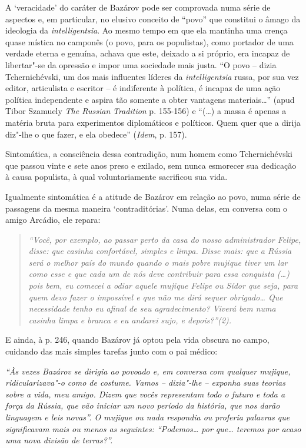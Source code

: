 A `veracidade' do caráter de Bazárov pode ser comprovada numa série de
aspectos e, em particular, no elusivo conceito de ``povo'' que constitui
o âmago da ideologia da \emph{intelligentsia}. Ao mesmo tempo em que ela
mantinha uma crença quase mística no camponês (o povo, para os
populistas), como portador de uma verdade eterna e genuína, achava que
este, deixado a si próprio, era incapaz de libertar"-se da opressão e
impor uma sociedade mais justa. ``O povo -- dizia Tchernichévski, um dos
mais influentes líderes da \emph{intelligentsia} russa, por sua vez
editor, articulista e escritor -- é indiferente à política, é incapaz de
uma ação política independente e aspira tão somente a obter vantagens
materiais\ldots{}'' (apud Tibor Szamuely \emph{The Russian} { }
\emph{Tradition} p. 155-156) e ``(\ldots{}) a massa é apenas a matéria bruta
para experimentos diplomáticos e políticos. Quem quer que a dirija
diz"-lhe o que fazer, e ela obedece'' (\emph{Idem}, p. 157).

Sintomática, a consciência dessa contradição, num homem como
Tchernichévski que passou vinte e sete anos preso e exilado, sem nunca
esmorecer sua dedicação à causa populista, à qual voluntariamente
sacrificou sua vida.

Igualmente sintomática é a atitude de Bazárov em relação ao povo, numa
série de passagens da mesma maneira `contraditórias'. Numa delas, em
conversa com o amigo Arcádio, ele repara:

\begin{quote}
\emph{``Você, por exemplo, ao passar perto da casa do nosso
administrador Felipe, disse: que casinha confortável, simples e limpa.
Disse mais: que a Rússia será o melhor país do mundo quando o mais pobre
mujique tiver um lar como esse e que cada um de nós deve contribuir para
essa conquista (\ldots{}) pois bem, eu comecei a odiar aquele mujique Felipe
ou Sídor que seja, para quem devo fazer o impossível e que não me dirá
sequer obrigado\ldots{} Que necessidade tenho eu afinal de seu
agradecimento? Viverá bem numa casinha limpa e branca e eu andarei sujo,
e depois?''(2). }
\end{quote}

E ainda, à p. 246, quando Bazárov já optou pela vida obscura no campo,
cuidando das mais simples tarefas junto com o pai médico:

\emph{``Às vezes Bazárov se dirigia ao povoado e, em conversa com
qualquer mujique, ridicularizava"-o como de costume. Vamos -- dizia"-lhe
-- exponha suas teorias sobre a vida, meu amigo. Dizem que vocês
representam todo o futuro e toda a força da Rússia, que vão iniciar um
novo período da história, que nos darão linguagem e leis novas''. O
mujique ou nada respondia ou proferia palavras que significavam mais ou
menos as seguintes: ``Podemos\ldots{} por que\ldots{} teremos por acaso uma
nova divisão de terras?''.}

